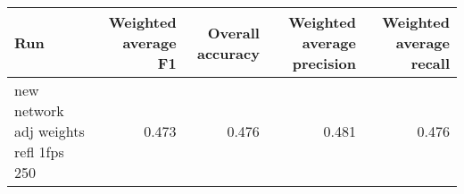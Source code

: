 \begin{tabular}{lrrrr}
\toprule
Run & Weighted average F1 & Overall accuracy & Weighted average precision & Weighted average recall \\
\midrule
new network adj weights refl 1fps 250 & 0.473 & 0.476 & 0.481 & 0.476 \\
\bottomrule
\end{tabular}
